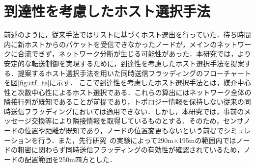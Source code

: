 \chapter{到達性を考慮したホスト選択手法}

前述のように，従来手法ではリストに基づくホスト選出を行っていた．待ち時間内に新ホストからのパケットを受信できなかったノードが，メインのネットワークに合流できず，ネットワーク分断が生じる可能性があった．本研究では，より安定的な転送制御を実現するために，到達性を考慮したホスト選択手法を提案する．提案するホスト選択手法を用いた同時送信フラッディングのフローチャートを図\ref{fig:ctf_te}に示す．
ここで到達性を考慮したホスト選択手法とは，媒介中心性と次数中心性によるホスト選択である．これらの算出にはネットワーク全体の隣接行列が既知であることが前提であり，トポロジー情報を保持しない従来の同時送信フラッディングにおいては適用できない．しかし，本研究では，事前のメッセージ交換等により隣接情報を取得しているものとする．そのため，センサノードの位置や距離が既知であり，ノードの位置変更もないという前提でシミュレーションを行う．また，先行研究~\cite{LoRa}の実験によって290\si{\meter}$\times$195\si{\meter}の範囲内ではノードの粗密に関わらず同時送信フラッディングの有効性が確認されているため，ノードの配置範囲を250\si{\meter}四方とした．

